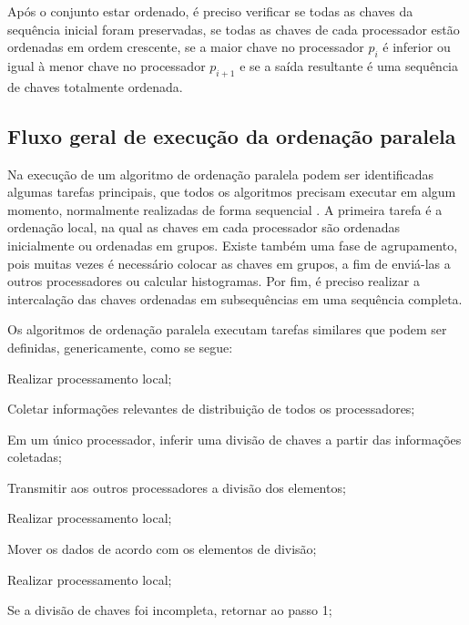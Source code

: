 Após o conjunto estar ordenado, é preciso verificar se todas as chaves da sequência inicial foram preservadas, se todas as chaves de cada processador estão ordenadas em ordem crescente, se a maior chave no processador $p_{i}$ é inferior ou igual à menor chave no processador $p_{i+1}$ e se a saída resultante é uma sequência de chaves totalmente ordenada.

\subsection{Fluxo geral de execução da ordenação paralela}

Na execução de um algoritmo de ordenação paralela podem ser identificadas algumas tarefas principais, que todos os algoritmos precisam executar em algum momento, normalmente realizadas de forma sequencial  \cite{Kale:2010}. 
A primeira tarefa é a ordenação local, na qual as chaves em cada processador são ordenadas inicialmente  ou ordenadas em grupos.
Existe também uma fase de agrupamento, pois muitas vezes é necessário colocar as chaves em grupos, a fim de enviá-las a outros processadores ou calcular histogramas. Por fim, é preciso realizar a intercalação das chaves ordenadas em subsequências em uma sequência completa.

Os algoritmos de ordenação paralela executam tarefas similares que podem ser definidas, genericamente, como se segue: 
\begin{num_enum}
\item Realizar processamento local;
\item Coletar informações relevantes de distribuição de todos os processadores;
\item Em um único processador, inferir uma divisão de chaves a partir das informações coletadas;
\item Transmitir aos outros processadores a divisão dos elementos;
\item Realizar processamento local;
\item Mover os dados de acordo com os elementos de divisão;
\item Realizar processamento local;
\item Se a divisão de chaves foi incompleta, retornar ao passo 1;
\end{num_enum}


